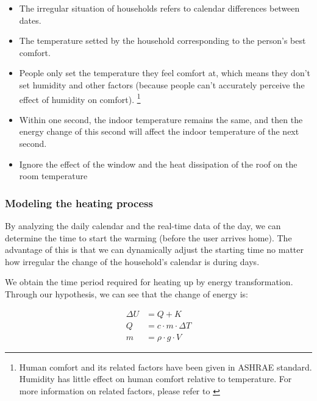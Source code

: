\documentclass{mcmthesis}
\begin{document}
				\begin{itemize}
					
					\item The irregular situation of households refers to calendar differences between dates.
					
					\item The temperature setted by the household corresponding to the person's best comfort.
					
					\item People only set the temperature they feel comfort at, which means they don't set humidity and other factors (because people can't accurately perceive the effect of humidity on comfort).
					\footnote{Human comfort and its related factors have been given in ASHRAE standard. Humidity has little effect on human comfort relative to temperature. For more information on related factors, please refer to  \cite{ashrae2013standard}}
					
					\item Within one second, the indoor temperature remains the same, and then the energy change of this second will affect the indoor temperature of the next second.
					
					\item Ignore the effect of the window and the heat dissipation of the roof on the room temperature
				
				\end{itemize}
			
			\subsubsection{Modeling the heating process}
				
				By analyzing the daily calendar and the real-time data of the day, we can determine the time to start the warming (before the user arrives home). The advantage of this is that we can dynamically adjust the starting time no matter how irregular the change of the household's calendar is during days.
				
				We obtain the time period required for heating up by energy transformation. Through our hypothesis, we can see that the change of energy is:
				
				
				\begin{align}
				\Delta U &= Q + K \\ 
				Q        &= c \cdot m \cdot \Delta T \\ 
				m        &= \rho \cdot g \cdot V
				\end{align}
				
\end{document}
